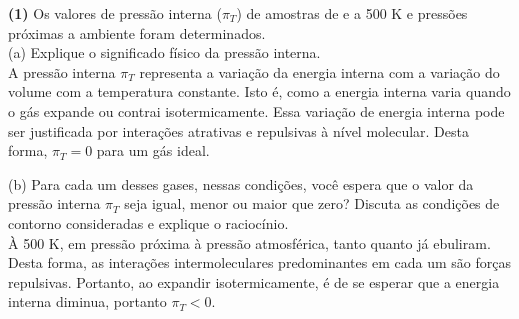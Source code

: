 \textbf{(1)} Os valores de pressão interna (\(\pi_T\)) de amostras de  e
 a 500 K e pressões próximas a ambiente foram determinados.\\

(a) Explique o significado físico da pressão interna.\\

   A pressão interna \( \pi_T \) representa a variação da energia interna com a
   variação do volume com a temperatura constante. Isto é, como a energia
   interna varia quando o gás expande ou contrai isotermicamente. Essa variação
   de energia interna pode ser justificada por interações atrativas e repulsivas
   à nível molecular. Desta forma, \( \pi_T = 0 \) para um gás ideal. 

(b) Para cada um desses gases, nessas condições, você espera que o valor da
pressão interna \(\pi_T\)  seja igual, menor ou maior que zero? Discuta as
condições de contorno consideradas e explique o raciocínio.\\

    À 500 K, em pressão próxima à pressão atmosférica, tanto  quanto
     já ebuliram. Desta forma, as
    interações intermoleculares predominantes em cada um são forças repulsivas.
    Portanto, ao expandir isotermicamente, é de se esperar que a energia interna
    diminua, portanto \( \pi_T < 0 \).
